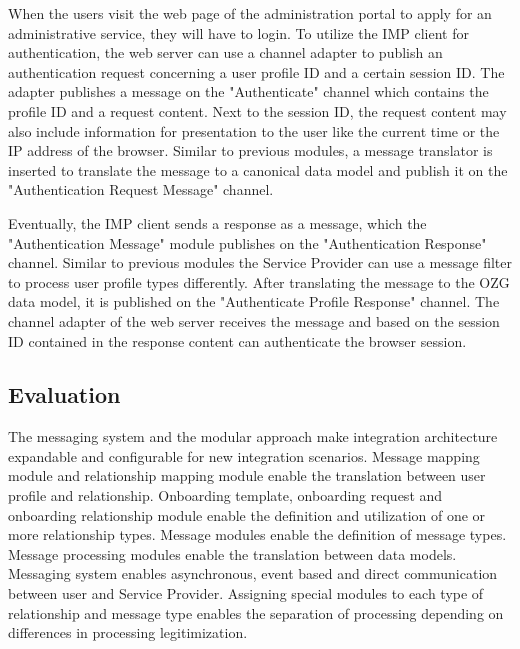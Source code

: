 When the users visit the web page of the administration portal to apply for an administrative service, they will have to login. To utilize the IMP client for authentication, the web server can use a channel adapter to publish an authentication request concerning a user profile ID and a certain session ID. The adapter publishes a message on the "Authenticate" channel which contains the profile ID and a request content. Next to the session ID, the request content may also include information for presentation to the user like the current time or the IP address of the browser. Similar to previous modules, a message translator is inserted to translate the message to a canonical data model and publish it on the "Authentication Request Message" channel.

Eventually, the IMP client sends a response as a message, which the "Authentication Message" module publishes on the "Authentication Response" channel. Similar to previous modules the Service Provider can use a message filter to process user profile types differently. After translating the message to the OZG data model, it is published on the "Authenticate Profile Response" channel. The channel adapter of the web server receives the message and based on the session ID contained in the response content can authenticate the browser session.

\subsection{Evaluation}

The messaging system and the modular approach make integration architecture expandable and configurable for new integration scenarios.
Message mapping module and relationship mapping module enable the translation between user profile and relationship.
Onboarding template, onboarding request and onboarding relationship module enable the definition and utilization of one or more relationship types.
Message modules enable the definition of message types.
Message processing modules enable the translation between data models.
Messaging system enables asynchronous, event based and direct communication between user and Service Provider.
Assigning special modules to each type of relationship and message type enables the separation of processing depending on differences in processing legitimization.
